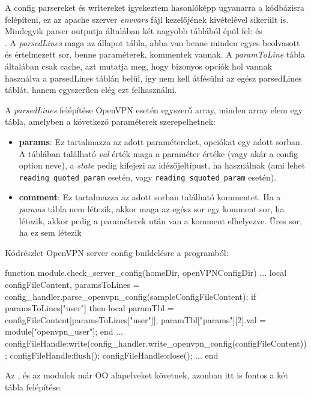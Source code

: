 A config parsereket és writereket igyekeztem hasonlóképp ugyanarra a kódbázisra felépíteni, ez az apache szerver \textit{envvars} fájl kezelőjének kivételével sikerült is. Mindegyik parser outputja általában két nagyobb táblából épül fel: \texttt{} és\\\texttt{}.
A \textit{parsedLines} maga az állapot tábla, abba van benne minden egyes beolvasott és értelmezett sor, benne paraméterek, kommentek vannak. A \textit{paramToLine} tábla általában csak cache, azt mutatja meg, hogy bizonyos opciók hol vannak használva a parsedLines táblán belül, így nem kell átfésülni az egész parsedLines táblát, hanem egyszerűen elég ezt felhasználni.

A \textit{parsedLines} felépítése OpenVPN esetén egyszerű array, minden array elem egy tábla, amelyben a következő paraméterek szerepelhetnek:

\begin{itemize}
	\item \textbf{params}: Ez tartalmazza az adott paramétereket, opciókat egy adott sorban. A táblában található \textit{val} érték maga a paraméter értéke (vagy akár a config option neve), a \textit{state} pedig kifejezi az idézőjeltípust, ha használnak (ami lehet \texttt{reading\_quoted\_param}  esetén, vagy \texttt{reading\_squoted\_param}  esetén).	
	\item \textbf{comment}: Ez tartalmazza az adott sorban található kommentet. Ha a \textit{params} tábla nem létezik, akkor maga az egész sor egy komment sor, ha létezik, akkor pedig a paraméterek után van a komment elhelyezve. Üres sor, ha ez sem létezik
\end{itemize}

Kódrészlet OpenVPN server config buildelésre a programból:

\begin{lua}
function module.check_server_config(homeDir, openVPNConfigDir)
	...
        local configFileContent, paramsToLines = config_handler.parse_openvpn_config(sampleConfigFileContent);
        if paramsToLines["user"] then
            local paramTbl = configFileContent[paramsToLines["user"]];
            paramTbl["params"][2].val = module["openvpn_user"];
        end
	...
        configFileHandle:write(config_handler.write_openvpn_config(configFileContent));
        configFileHandle:flush();
        configFileHandle:close();
	...
end
\end{lua}
\pagebreak
Az \texttt{}, és az \texttt{} modulok már OO alapelveket követnek, azonban itt is fontos a két tábla felépítése.

